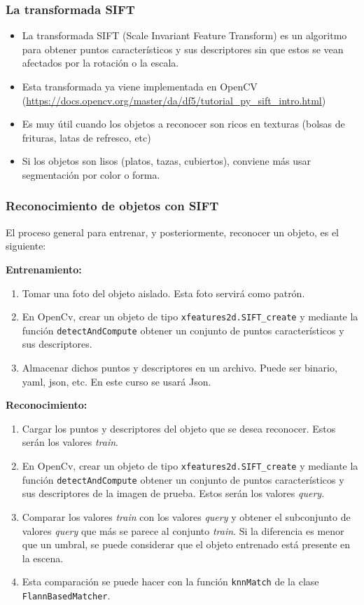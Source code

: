 \documentclass[10pt,spanish,aspectratio=1610]{beamer}
\begin{document}
\begin{frame}\frametitle{La transformada SIFT}
  \begin{itemize}
  \item La transformada SIFT (Scale Invariant Feature Transform) es un algoritmo para obtener puntos característicos y sus descriptores sin que estos se vean afectados por la rotación o la escala.
  \item Esta transformada ya viene implementada en OpenCV (\url{https://docs.opencv.org/master/da/df5/tutorial_py_sift_intro.html})
  \item Es muy útil cuando los objetos a reconocer son ricos en texturas (bolsas de frituras, latas de refresco, etc)
  \item Si los objetos son lisos (platos, tazas, cubiertos), conviene más usar segmentación por color o forma.
  \end{itemize}
\end{frame}

\begin{frame}\frametitle{Reconocimiento de objetos con SIFT}
  El proceso general para entrenar, y posteriormente, reconocer un objeto, es el siguiente:

  \textbf{Entrenamiento:}
  \begin{enumerate}
  \item Tomar una foto del objeto aislado. Esta foto servirá como patrón.
  \item En OpenCv, crear un objeto de tipo \texttt{xfeatures2d.SIFT\_create} y mediante la función \texttt{detectAndCompute} obtener un conjunto de puntos característicos y sus descriptores.
  \item Almacenar dichos puntos y descriptores en un archivo. Puede ser binario, yaml, json, etc. En este curso se usará Json.
  \end{enumerate}

  \textbf{Reconocimiento:}
  \begin{enumerate}
  \item Cargar los puntos y descriptores del objeto que se desea reconocer. Estos serán los valores \textit{train}.
  \item En OpenCv, crear un objeto de tipo \texttt{xfeatures2d.SIFT\_create} y mediante la función \texttt{detectAndCompute} obtener un conjunto de puntos característicos y sus descriptores de la imagen de prueba. Estos serán los valores \textit{query}.
  \item Comparar los valores \textit{train} con los valores \textit{query} y obtener el subconjunto de valores \textit{query} que más se parece al conjunto \textit{train}. Si la diferencia es menor que un umbral, se puede considerar que el objeto entrenado está presente en la escena.
  \item Esta comparación se puede hacer con la función \texttt{knnMatch} de la clase \texttt{FlannBasedMatcher}.
  \end{enumerate}
\end{frame}
\end{document}
